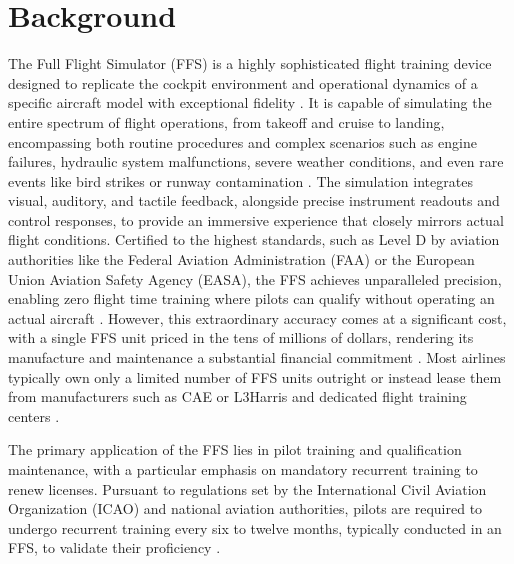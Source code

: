 \documentclass[opre,sglanonrev]{informs4}
\begin{document}
\section{Background}
The Full Flight Simulator (FFS) is a highly sophisticated flight training device designed to replicate the cockpit environment and operational dynamics of a specific aircraft model with exceptional fidelity \citep{ICAO2015}. 
It is capable of simulating the entire spectrum of flight operations, from takeoff and cruise to landing, encompassing both routine procedures and complex scenarios such as engine failures, hydraulic system malfunctions, severe weather conditions, and even rare events like bird strikes or runway contamination \citep{Advancements2024}. The simulation integrates visual, auditory, and tactile feedback, alongside precise instrument readouts and control responses, to provide an immersive experience that closely mirrors actual flight conditions. Certified to the highest standards, such as Level D by aviation authorities like the Federal Aviation Administration (FAA) or the European Union Aviation Safety Agency (EASA), the FFS achieves unparalleled precision, enabling zero flight time training where pilots can qualify without operating an actual aircraft \citep{FAA1995,EASA2020}. However, this extraordinary accuracy comes at a significant cost, with a single FFS unit priced in the tens of millions of dollars, rendering its manufacture and maintenance a substantial financial commitment \citep{CAE7000XR}. Most airlines typically own only a limited number of FFS units outright or instead lease them from manufacturers such as CAE or L3Harris and dedicated flight training centers \citep{IBAAero2023}.

The primary application of the FFS lies in pilot training and qualification maintenance, with a particular emphasis on mandatory recurrent training to renew licenses. Pursuant to regulations set by the International Civil Aviation Organization (ICAO) and national aviation authorities, pilots are required to undergo recurrent training every six to twelve months, typically conducted in an FFS, to validate their proficiency \citep{Flightradar2024}.
\end{document}
